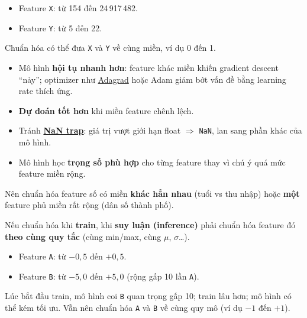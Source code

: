 \documentclass[12pt,a4paper]{article}
\begin{document}
\begin{vidu}[title={Hai feature quy mô rất khác nhau}]
\begin{itemize}
  \item Feature \texttt{X}: từ 154 đến 24\,917\,482.
  \item Feature \texttt{Y}: từ 5 đến 22.
\end{itemize}
Chuẩn hóa có thể đưa \texttt{X} và \texttt{Y} về cùng miền, ví dụ 0 đến 1.
\end{vidu}

\begin{tinhchat}[title={Lợi ích chuẩn hóa}]
\begin{itemize}
  \item Mô hình \textbf{hội tụ nhanh hơn}: feature khác miền khiến gradient descent ``nảy''; optimizer như \href{https://developers.google.com/machine-learning/glossary\#adagrad}{Adagrad} hoặc Adam giảm bớt vấn đề bằng learning rate thích ứng.
  \item \textbf{Dự đoán tốt hơn} khi miền feature chênh lệch.
  \item Tránh \href{https://developers.google.com/machine-learning/glossary\#NaN_trap}{\textbf{NaN trap}}: giá trị vượt giới hạn float $\Rightarrow$ \texttt{NaN}, lan sang phần khác của mô hình.
  \item Mô hình học \textbf{trọng số phù hợp} cho từng feature thay vì chú ý quá mức feature miền rộng.
\end{itemize}
\end{tinhchat}

\begin{luuy}
Nên chuẩn hóa feature số có miền \textbf{khác hẳn nhau} (tuổi vs thu nhập) hoặc \textbf{một} feature phủ miền rất rộng (dân số thành phố).
\end{luuy}

\begin{luuy}[title={Cảnh báo quan trọng}]
Nếu chuẩn hóa khi \textbf{train}, khi \textbf{suy luận (inference)} phải chuẩn hóa feature đó \textbf{theo cùng quy tắc} (cùng min/max, cùng $\mu$, $\sigma$\ldots).
\end{luuy}

\begin{vidu}[title={Feature miền hẹp nhưng chênh 10 lần}]
\begin{itemize}
  \item Feature \texttt{A}: từ $-0{,}5$ đến $+0{,}5$.
  \item Feature \texttt{B}: từ $-5{,}0$ đến $+5{,}0$ (rộng gấp 10 lần \texttt{A}).
\end{itemize}
Lúc bắt đầu train, mô hình coi \texttt{B} quan trọng gấp 10; train lâu hơn; mô hình có thể kém tối ưu. Vẫn nên chuẩn hóa \texttt{A} và \texttt{B} về cùng quy mô (ví dụ $-1$ đến $+1$).
\end{vidu}
\end{document}
